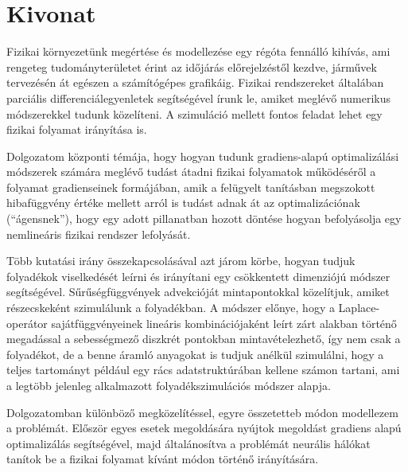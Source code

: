 \setcounter{page}{1}

\selecthungarian

\chapter*{Kivonat}

Fizikai környezetünk megértése és modellezése egy régóta fennálló kihívás, ami
rengeteg tudományterületet érint az időjárás előrejelzéstől kezdve, járművek
tervezésén át egészen a számítógépes grafikáig. Fizikai rendszereket általában
parciális differenciálegyenletek segítségével írunk le, amiket meglévő numerikus
módszerekkel tudunk közelíteni. A szimuláció mellett fontos feladat lehet egy
fizikai folyamat irányítása is.  

Dolgozatom központi témája, hogy hogyan tudunk gradiens-alapú optimalizálási
módszerek számára meglévő tudást átadni fizikai folyamatok működéséről
a folyamat gradienseinek formájában, amik a felügyelt tanításban megszokott
hibafüggvény értéke mellett arról is tudást adnak át az optimalizációnak
(``ágensnek''), hogy egy adott pillanatban hozott döntése hogyan befolyásolja
egy nemlineáris fizikai rendszer lefolyását.

Több kutatási irány összekapcsolásával azt járom körbe, hogyan tudjuk folyadékok
viselkedését leírni és irányítani egy csökkentett dimenziójú módszer
segítségével. Sűrűségfüggvények advekcióját mintapontokkal közelítjuk, amiket
részecskeként szimulálunk a folyadékban. A módszer előnye, hogy
a Laplace-operátor sajátfüggvényeinek lineáris kombinációjaként leírt zárt
alakban történő megadással a sebességmező diszkrét pontokban mintavételezhető,
így nem csak a folyadékot, de a benne áramló anyagokat is tudjuk anélkül
szimulálni, hogy a teljes tartományt például egy rács adatstruktúrában kellene
számon tartani, ami a legtöbb jelenleg alkalmazott folyadékszimulációs módszer
alapja.

Dolgozatomban különböző megközelítéssel, egyre összetetteb módon modellezem
a problémát. Először egyes esetek megoldására nyújtok megoldást gradiens alapú
optimalizálás segítségével, majd általánosítva a problémát neurális hálókat
tanítok be a fizikai folyamat kívánt módon történő irányítására.

\vfill
\selectenglish

